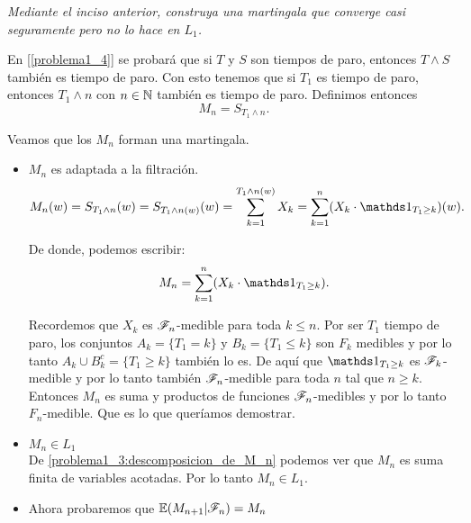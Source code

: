 \emph
{	
	Mediante el inciso anterior, construya una martingala que converge 
	casi seguramente pero no lo hace en $L_1$.\\
}
	
	En [\ref{problema1_4}] se probará que si $T$ y $S$ son tiempos de paro, entonces $T\wedge S$ también 
	es tiempo de paro. Con esto tenemos que si $T_1$ es tiempo de paro, entonces $T_1 \wedge n$ con 
	$n \in \mathbb{N}$ también es tiempo de paro. Definimos entonces 
	$$M_n = S_{T_1 \wedge n}.$$
	
	Veamos que los $M_n$ forman una martingala.
	
	\begin{itemize}
		\item 
			$M_n$ es adaptada a la filtración.
			\begin{align}
				M_n(w) = S_{T_1 \wedge n}(w) = 
				S_{T_1 \wedge n (w)}(w) = 
				\sum_{k=1}^{T_1 \wedge n (w)} X_k = 
				\sum_{k=1}^{n} (X_k \cdot \indic_{T_1 \geq k})(w).
			\end{align}
			
			De donde, podemos escribir:
			\begin{align}\label{problema1_3:descomposicion_de_M_n}
				M_n = \sum_{k=1}^{n} (X_k \cdot \indic_{T_1 \geq k}).
			\end{align}								 		
			
			Recordemos que $X_k$ es $\mathscr{F}_n$-medible para toda $k \leq n $. Por ser
			$T_1$ tiempo de paro, los conjuntos $A_k = \{T_1 = k\}$ y 
			$B_k = \{T_1 \leq k\}$	son $F_k$ medibles y por lo tanto 
			$A_k \cup B_k^c = \{ T_1 \geq k\}$ también lo es. De aquí que 
			$\indic_{T_1 \geq k}$ es $\mathscr{F}_k$-medible y por lo tanto también $\mathscr{F}_n$-medible
			para toda $n$ tal que $n \geq k$.\\
			  
			Entonces $M_n$ es suma y productos de funciones $\mathscr{F}_n$-medibles y por lo tanto
			$F_n$-medible. Que es lo que queríamos demostrar.\\
			
		\item
			$M_n \in L_1$\\
			
			De \eqref{problema1_3:descomposicion_de_M_n} podemos ver que $M_n$ es 
			suma finita de variables acotadas. Por lo tanto $M_n \in L_1$.\\
			
		\item Ahora probaremos que	$\mathbb{E}(M_{n+1} | \mathscr{F}_{n}) = M_{n}$\\
			

\end{itemize}
